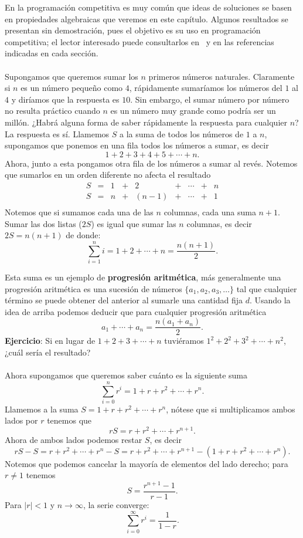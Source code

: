En la programación competitiva es muy común que ideas de soluciones se basen en propiedades algebraicas que veremos en este capítulo. Algunos resultados se presentan sin demostración, pues el objetivo es su uso en programación competitiva; el lector interesado puede consultarlos en~\cite{perez_algebra} y en las referencias indicadas en cada sección.
\\\\ Supongamos que queremos sumar los $n$ primeros números naturales. Claramente si $n$ es un número pequeño como $4$, rápidamente sumaríamos los números del $1$ al $4$ y diríamos que la respuesta es $10$. Sin embargo, el sumar número por número no resulta práctico cuando $n$ es un número muy grande como podría ser un millón. ¿Habrá alguna forma de saber rápidamente la respuesta para cualquier $n$? La respuesta es sí. Llamemos $S$ a la suma de todos los números de $1$ a $n$, supongamos que ponemos en una fila todos los números a sumar, es decir
\[
1 + 2 + 3 + 4 + 5 + \cdots + n.
\]
Ahora, junto a esta pongamos otra fila de los números a sumar al revés. Notemos que sumarlos en un orden diferente no afecta el resultado
\[\begin{array}{ccccccccc}
S &=& 1 &+& 2 &+& \cdots &+& n \\
S &=& n &+& (n-1) &+& \cdots &+& 1 \\
\end{array}\]
Notemos que si sumamos cada una de las $n$ columnas, cada una suma $n+1$. Sumar las dos listas ($2S$) es igual que sumar las $n$ columnas, es decir $2S=n(n+1)$ de donde:
\[
\sum_{i=1}^{n} i = 1 + 2 + \cdots + n = \frac{n(n+1)}{2}.
\]

Esta suma es un ejemplo de \textbf{progresión aritmética}, más generalmente una progresión aritmética es una sucesión de números $\{a_1,a_2, a_3, \dots \}$ tal que cualquier término se puede obtener del anterior al sumarle una cantidad fija $d$. Usando la idea de arriba podemos deducir que para cualquier progresión aritmética
\[
a_1+\cdots + a_n = \frac{n(a_1+a_n)}{2}.
\]
\textbf{Ejercicio}: Si en lugar de $1 + 2 + 3 + \cdots + n$ tuviéramos $1^2 + 2^2 + 3^2 + \cdots + n^2$, ¿cuál sería el resultado?
\\\\Ahora supongamos que queremos saber cuánto es la siguiente suma
\[
\sum_{i=0}^{n} r^i = 1 + r + r^2 + \cdots + r^{n}.
\]
Llamemos a la suma $S= 1 + r + r^2 + \cdots + r^{n}$, nótese que si multiplicamos ambos lados por $r$ tenemos que
\[
rS=r+r^2+\cdots+r^{n+1}.
\]
Ahora de ambos lados podemos restar $S$, es decir
\[
rS-S=r+r^2+\cdots+r^n-S=r+r^2+\cdots+r^{n+1}-(1+r+r^2+\cdots+r^n).
\]
Notemos que podemos cancelar la mayoría de elementos del lado derecho; para $r\neq1$ tenemos
\[
S=\frac{r^{n+1}-1}{r-1}.
\]
Para $|r| < 1$ y $n \to \infty$, la serie converge:
\[
\sum_{i=0}^{\infty} r^i = \frac{1}{1-r}.
\]

